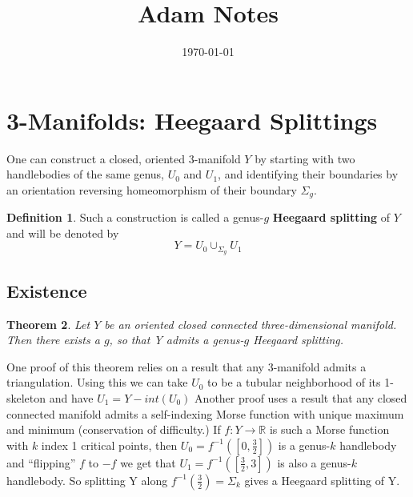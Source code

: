 \documentclass{amsart}
\title{Adam Notes}
\author{}
\date{\today}
\newtheorem{theorem}{Theorem}[section]
\theoremstyle{definition}
\newtheorem{definition}[theorem]{Definition}
\begin{document}
\maketitle

\section{3-Manifolds: Heegaard Splittings}
One can construct a closed, oriented 3-manifold $Y$ by starting with two handlebodies of the same genus, $U_{0}$ and  $U_{1}$, and identifying their boundaries by an orientation reversing homeomorphism of their boundary $\Sigma_{g}.$ \begin{definition} Such a construction is called a genus-$g$  \textbf{Heegaard splitting} of $Y$ and will be denoted by $$Y = U_{0} \cup_{\Sigma_{g}} U_{1}$$\end{definition}

\subsection{Existence}

\begin{theorem} Let $Y$ be an oriented closed connected three-dimensional manifold. Then there exists a $g$, so that Y admits a genus-$g$ Heegaard splitting.\end{theorem} One proof of this theorem relies on a result that any 3-manifold admits a triangulation. Using this we can take $U_{0}$ to be a tubular neighborhood of its 1-skeleton and have $U_{1} = Y-int(U_{0})$ \newline \newline Another proof uses a result that any closed connected manifold admits a self-indexing Morse function with unique maximum and minimum (conservation of difficulty.) If $f: Y \rightarrow \mathbb{R}$ is such a Morse function with $k$ index 1 critical points, then $U_{0} = f^{-1}([0, \frac{3}{2}])$ is a genus-$k$ handlebody and ``flipping'' $f$ to $-f$ we get that $U_{1} = f^{-1}([\frac{3}{2}, 3])$ is also a genus-$k$ handlebody. So splitting Y along $f^{-1}(\frac{3}{2}) = \Sigma_{k}$ gives a Heegaard splitting of Y. 
\end{document}
